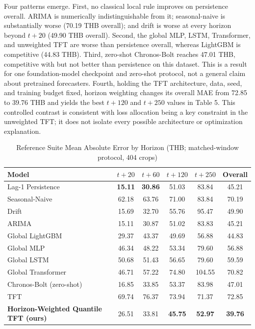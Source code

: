 \documentclass[review,3p,times]{elsarticle}
\begin{document}
Four patterns emerge. First, no classical local rule improves on persistence overall. ARIMA is numerically indistinguishable from it; seasonal-naive is substantially worse (70.19 THB overall); and drift is worse at every horizon beyond $t+20$ (49.90 THB overall). Second, the global MLP, LSTM, Transformer, and unweighted TFT are worse than persistence overall, whereas LightGBM is competitive (44.83 THB). Third, zero-shot Chronos-Bolt reaches 47.01 THB, competitive with but not better than persistence on this dataset. This is a result for one foundation-model checkpoint and zero-shot protocol, not a general claim about pretrained forecasters. Fourth, holding the TFT architecture, data, seed, and training budget fixed, horizon weighting changes its overall MAE from 72.85 to 39.76 THB and yields the best $t+120$ and $t+250$ values in Table 5. This controlled contrast is consistent with loss allocation being a key constraint in the unweighted TFT; it does not isolate every possible architecture or optimization explanation.

\begin{table}[htbp]\centering
\caption{Reference Suite Mean Absolute Error by Horizon (THB; matched-window protocol, 404 crops)}
\small
\begin{tabular}{lccccc}
\toprule
Model & $t+20$ & $t+60$ & $t+120$ & $t+250$ & Overall \\
\midrule
Lag-1 Persistence & \textbf{15.11} & \textbf{30.86} & 51.03 & 83.84 & 45.21 \\
Seasonal-Naive & 62.18 & 63.76 & 71.00 & 83.84 & 70.19 \\
Drift & 15.69 & 32.70 & 55.76 & 95.47 & 49.90 \\
ARIMA & 15.11 & 30.87 & 51.02 & 83.83 & 45.21 \\
Global LightGBM & 29.37 & 43.37 & 49.69 & 56.88 & 44.83 \\
Global MLP & 46.34 & 48.22 & 53.34 & 79.60 & 56.88 \\
Global LSTM & 50.68 & 51.43 & 56.65 & 79.60 & 59.59 \\
Global Transformer & 46.71 & 57.22 & 74.80 & 104.55 & 70.82 \\
Chronos-Bolt (zero-shot) & 16.85 & 33.85 & 53.37 & 83.98 & 47.01 \\
TFT & 69.74 & 76.37 & 73.94 & 71.37 & 72.85 \\
\textbf{Horizon-Weighted Quantile TFT (ours)} & 26.51 & 33.81 & \textbf{45.75} & \textbf{52.97} & \textbf{39.76} \\
\bottomrule
\end{tabular}
\end{table}
\end{document}
